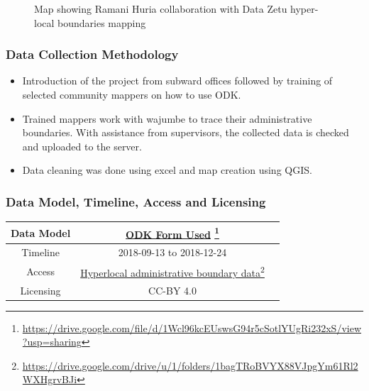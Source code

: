 \documentclass[a4paper,12pt,twoside]{article}
\begin{document}
\begin{figure}[h]
  \color{RHgreen}\caption{Map showing Ramani Huria collaboration with Data Zetu hyper-local boundaries mapping}
  \centering
\end{figure}

\subsubsection{Data Collection Methodology}
\begin{itemize}
    \item Introduction of the project from subward offices followed by training of selected community mappers on how to use ODK.
    \item Trained mappers work with wajumbe to trace their administrative boundaries. With assistance from supervisors, the collected data is checked and uploaded to the server. 
    \item Data cleaning was done using excel  and map creation using QGIS.
\end{itemize}

\subsubsection{Data Model, Timeline, Access and Licensing}
\begin{center}
\begin{tabular}{|c|c|c|}  
 \hline
Data Model &
        \href{https://drive.google.com/file/d/1Wcl96kcEUswsG94r5cSotlYUgRi232xS/view?usp=sharing}{ODK Form Used} \footnote{\url{https://drive.google.com/file/d/1Wcl96kcEUswsG94r5cSotlYUgRi232xS/view?usp=sharing}} \\
 \hline
  Timeline  &  2018-09-13 to 2018-12-24 \\
\hline  
 Access  & 
    \href{https://drive.google.com/drive/u/1/folders/1bagTRoBVYX88VJpgYm61Rl2WXHgrvBJi}{Hyperlocal administrative boundary data}\footnote{\url{https://drive.google.com/drive/u/1/folders/1bagTRoBVYX88VJpgYm61Rl2WXHgrvBJi}} \\
   
\hline 
    Licensing & CC-BY 4.0 \\
\hline
\end{tabular}
\end{center}
\end{document}
